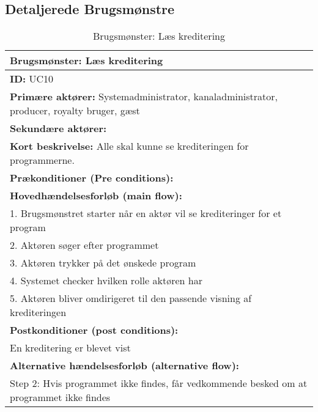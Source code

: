 \subsection{Detaljerede Brugsmønstre}

\begin{table}[ht]
    \begin{tabularx}{\textwidth}{|X|}
        \hline
        \textbf{Brugsmønster:}  Læs kreditering \\ 
        \hline
    	\textbf{ID:} UC10 \\ 
    	\hline
    	\textbf{Primære aktører:} Systemadministrator, kanaladministrator, producer, royalty bruger, gæst \\ \hline
    	\textbf{Sekundære aktører:} \\ \hline
    	\textbf{Kort beskrivelse:} Alle skal kunne se krediteringen for programmerne. \\ \hline
    	\textbf{Prækonditioner (Pre conditions):} \\ \hline
        \textbf{Hovedhændelsesforløb (main flow):} \\
        1. Brugsmønstret starter når en aktør vil se krediteringer for et program \\
        2. Aktøren søger efter programmet \\
        3. Aktøren trykker på det ønskede program \\
        4. Systemet checker hvilken rolle aktøren har \\
        5. Aktøren bliver omdirigeret til den passende visning af krediteringen \\ \hline
            \textbf{Postkonditioner (post conditions):} \\
            En kreditering er blevet vist \\ \hline
        
        	\textbf{Alternative hændelsesforløb (alternative flow):} \\
        Step 2: Hvis programmet ikke findes, får vedkommende besked om at programmet ikke findes \\ 
        \hline
    \end{tabularx}
    \caption{Brugsmønster: Læs kreditering}
    \label{table:read_credits}
\end{table}

